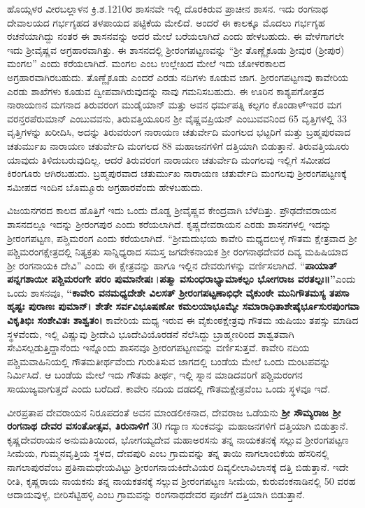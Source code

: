 ಹೊಯ್ಸಳರ ವೀರಬಲ್ಲಾಳನ ಕ್ರಿ.ಶ.1210ರ ಶಾಸನವೇ ಇಲ್ಲಿ ದೊರಕಿರುವ ಪ್ರಾಚೀನ ಶಾಸನ. ಇದು ರಂಗನಾಥ ದೇವಾಲಯದ ಗರ್ಭಗೃಹದ ತಳಪಾಯದ ಪಟ್ಟಿಕೆಯ ಮೇಲಿದೆ. ಅಂದರೆ ಈ ಕಾಲಕ್ಕೂ ಮೊದಲು ಗರ್ಭಗೃಹ ರಚನೆಯಾಗಿದ್ದು ನಂತರ ಈ ಶಾಸನವನ್ನು ಅದರ ಮೇಲೆ ಬರೆಯಲಾಗಿದೆ ಎಂದು ಹೇಳಬಹುದು. ಈ ವೇಳೆಗಾಗಲೇ ಇದು ಶ‍್ರೀವೈಷ್ಣವ ಅಗ್ರಹಾರವಾಗಿತ್ತು. ಈ ಶಾಸನದಲ್ಲಿ ಶ‍್ರೀರಂಗಪಟ್ಟಣವನ್ನು “ಶ‍್ರೀ ತೊಣ್ಣೈಕೂಡು ಶ‍್ರೀವುರ (ಶ‍್ರೀಪುರ) ಮಂಗಲ” ಎಂದು ಕರೆಯಲಾಗಿದೆ. ಮಂಗಲ ಎಂಬ ಉಲ್ಲೇಖದ ಮೇಲೆ ಇದು ಚೋಳರಕಾಲದ ಅಗ್ರಹಾರವಾಗಿರಬಹುದು. ತೊಣ್ಣೈಕೂಡು ಎಂದರೆ ಎರಡು ನದಿಗಳು ಕೂಡುವ ಜಾಗ. ಶ‍್ರೀರಂಗಪಟ್ಟಣವು ಕಾವೇರಿಯ ಎರಡು ಶಾಖೆಗಳು ಕೂಡುವ ದ್ವೀಪವಾಗಿರುವುದನ್ನು ನಾವು ಗಮನಿಸಬಹುದು. ಈ ಊರಿನ ಕಾಶ್ಯಪಗೋತ್ರದ ನಾರಾಯಣನ ಮಗನಾದ ತಿರುವರಂಗ ಮುಡೈಯಾನ್​ ಮತ್ತು ಅವನ ಧರ್ಮಪತ್ನಿ ಕಲ್ಪಗಂ ಕೊಂಡಾಳ್​ ಇವರ ಮಗ ವರನ್ತರಪೆರುಮಾನ್​ ಎಂಬುವವನು, ತಿರುವತ್ತಿಯೂರಿನ ಶ‍್ರೀ ವೈಷ್ಣವಪ್ರಿಯನ್​ ಎಂಬುವವನಿಂದ 65 ವೃತ್ತಿಗಳಲ್ಲಿ 33 ವೃತ್ತಿಗಳನ್ನು ಖರೀದಿಸಿ, ಅದನ್ನು ತಿರುವರುಂಗ ನಾರಾಯಣ ಚತುರ್ವೇದಿ ಮಂಗಲದ ಭಟ್ಟರಿಗೆ ಮತ್ತು ಬ್ರಹ್ಮಪುರವಾದ ಚತುರ್ಮುಖ ನಾರಾಯಣ ಚತುರ್ವೇದಿ ಮಂಗಲದ 88 ಮಹಾಜನಗಳಿಗೆ ದತ್ತಿಯಾಗಿ ಬಿಡುತ್ತಾನೆ. ತಿರುವತ್ತಿಯೂರು ಯಾವುದು ತಿಳಿದುಬರುವುದಿಲ್ಲ. ಆದರೆ ತಿರುವರಂಗ ನಾರಾಯಣ ಚತುರ್ವೇದಿ ಮಂಗಲವು ಇಲ್ಲಿಗೆ ಸಮೀಪದ ಕಿರಂಗೂರು ಆಗಿರಬಹುದು. ಬ್ರಹ್ಮಪುರವಾದ ಚತುರ್ಮುಖ ನಾರಾಯಣ ಚತುರ್ವೇದಿ ಮಂಗಲವು ಶ‍್ರೀರಂಗಪಟ್ಟಣಕ್ಕೆ ಸಮೀಪದ ಇಂದಿನ ಬೊಮ್ಮೂರು ಅಗ್ರಹಾರವೆಂದು ಹೇಳಬಹುದು.

ವಿಜಯನಗರದ ಕಾಲದ ಹೊತ್ತಿಗೆ ಇದು ಒಂದು ದೊಡ್ಡ ಶ‍್ರೀವೈಷ್ಣವ ಕೇಂದ್ರವಾಗಿ ಬೆಳೆದಿತ್ತು. ಪ್ರೌಢದೇವರಾಯನ ಶಾಸನದಲ್ಲೂ ಇದನ್ನು ಶ‍್ರೀರಂಗಪುರ ಎಂದು ಕರೆಯಲಾಗಿದೆ. ಕೃಷ್ಣದೇವರಾಯನ ಎರಡು ಶಾಸನಗಳಲ್ಲಿ ಇದನ್ನು ಶ‍್ರೀರಂಗಪಟ್ಟಣ, ಪಶ್ಚಿಮರಂಗ ಎಂದು ಕರೆಯಲಾಗಿದೆ. “ಶ‍್ರೀಮದುಭಯ ಕಾವೇರಿ ಮಧ್ಯದಲುಳ್ಳ ಗೌತಮ ಕ್ಷೇತ್ರವಾದ ಶ‍್ರೀ ಪಶ್ಚಿಮರಂಗಕ್ಷೇತ್ರದಲ್ಲಿ ನಿತ್ಯಕ್ರತು ಸಾನ್ನಿಧ್ಯರಾದ ಸಮಸ್ತ ಜಗದೇಕನಾಯಕ ಶ‍್ರೀ ರಂಗನಾಥದೇವರ ದಿವ್ಯ ಮಹಿಷಿಯಾದ ಶ‍್ರೀ ರಂಗನಾಯಕಿ ದೇವಿ” ಎಂದು ಈ ಕ್ಷೇತ್ರವನ್ನು ಹಾಗೂ ಇಲ್ಲಿನ ದೇವರುಗಳನ್ನು ವರ್ಣಿಸಲಾಗಿದೆ. “\textbf{ಪಾಯಾತ್​ ಪನ್ನಗಶಾಯೀ ಪಶ್ಚಿಮರಂಗೇ ಪರಂ ಪುಮಾನೇಷಃ}।\textbf{ಪತ್ಮಾ ವಸುಂಧರಾಭ್ಯಾಮಾಕಲ್ಪಂ ಭೋಗರಾಜ ವರತಲ್ಪಃ॥”}ಎಂದು ಒಂದು ಶಾಸನವೂ, \textbf{“ಕಾವೇರಿ ವನಮಧ್ಯದೇಶೇ ವಿಲಸತ್​ ಶ‍್ರೀರಂಗಪಟ್ಟಣಾಭಿಧೇ ವೈಕುಂಠೇ ಮುನಿಗೌತಮಸ್ಯ ತಪಸಾ ಹೃಷ್ಟಃ ಪುರಾಣಃ ಪುಮಾನ್​। ಶೇತೇ ಸರ್ವವಿಭೂಷಣೋ ಕಮಲಯಾಭೂಮ್ಯೇ ಸಮಾರಾಧಿತಾಶೇಷೈರ್ಭೂಸುರಪುಂಗವಾ ವಿಕೃತಿಭಿಃ ಸಂಶೇವಿತಃ ಶಾಶ್ವತಂ।} ಕಾವೇರಿಯ ಮಧ್ಯ ಇರುವ ಈ ವೈಕುಂಠಕ್ಷೇತ್ರವು ಗೌತಮ ಋಷಿಯು ತಪಸ್ಸು ಮಾಡಿದ ಸ್ಥಳವೆಂದು, ಇಲ್ಲಿ ವಿಷ್ಣುವು ಶ‍್ರೀದೇವಿ ಭೂದೇವಿಯೊರಡನೆ ನೆಲೆಸಿದ್ದು ಬ್ರಾಹ್ಮಣರಿಂದ ಶಾಶ್ವತವಾಗಿ ಸೇವಿಸಲ್ಪಡುತ್ತಿದ್ದಾನೆಂದು ಇನ್ನೊಂದು ಶಾಸನವೂ ಶ‍್ರೀರಂಗಪಟ್ಟಣವನ್ನು ವರ್ಣಿಸುತ್ತವೆ. ಕಾವೇರಿ ನದಿಯ ಪಶ್ಚಿಮವಾಹಿನಿಯಲ್ಲಿ ಗೌತಮತೀರ್ಥವೆಂದು ಗುರುತಿಸುವ ಜಾಗದಲ್ಲಿ ಬಂಡೆಯ ಮೇಲೆ ಒಂದು ಮಂಟಪವನ್ನು ನಿರ್ಮಿಸಿದೆ. ಆ ಬಂಡೆಯ ಮೇಲೆ ಇದು ಗೌತಮ ತೀರ್ಥ, ಇಲ್ಲಿ ಸ್ನಾನ ಮಾಡಿದವರಿಗೆ ಪಶ್ಚಿಮರಂಗನ ಸಾಯುಜ್ಯವಾಗುತ್ತದೆ ಎಂದು ಬರೆದಿದೆ. ಕಾವೇರಿ ನದಿಯ ದಡದಲ್ಲಿ ಗೌತಮಕ್ಷೇತ್ರವೆಂಬ ಒಂದು ಸ್ಥಳವೂ ಇದೆ.

ವೀರಪ್ರತಾಪ ದೇವರಾಯನ ನಿರೂಪದಂತೆ ಅವನ ಮಾಂಡಲೀಕನಾದ, ದೇವರಾಜ ಒಡೆಯನು \textbf{ಶ‍್ರೀ ಸೌಮ್ಯರಾಜ ಶ‍್ರೀ ರಂಗನಾಥ ದೇವರ ವಸಂತೋತ್ಸವ, ತಿರುನಾಳಿಗೆ} 30 ಗದ್ಯಾಣ ಸುಂಕವನ್ನು ಮಹಾಜನಗಳಿಗೆ ದತ್ತಿಯಾಗಿ ಬಿಡುತ್ತಾನೆ. ಕೃಷ್ಣದೇವರಾಯನ ಅನುಮತಿಯಿಂದ, ಭೋಗಯ್ಯದೇವ ಮಹಾಅರಸನು ತನ್ನ ನಾಯಕತನಕ್ಕೆ ಸಲ್ಲುವ ಶ‍್ರೀರಂಗಪಟ್ಟಣ ಸೀಮೆಯ, ಗುಮ್ಮನವೃತ್ತಿಯ ಸ್ಥಳದ, ದೇವಪುರಿ ಎಂಬ ಗ್ರಾಮವನ್ನು ತನ್ನ ತಾಯಿ ನಾಗಲಾಂಬಿಕೆಯ ಹೆಸರಿನಲ್ಲಿ ನಾಗಲಾಪುರವೆಂಬ ಪ್ರತಿನಾಮಧೇಯವಿಟ್ಟು ಶ‍್ರೀರಂಗನಾಯಕಿದೇವಿಯರ ದಿವ್ಯಲೀಲಾವಿಲಾಸಕ್ಕೆ ದತ್ತಿ ಬಿಡುತ್ತಾನೆ. ಇದೇ ರೀತಿ, ಕೃಷ್ಣರಾಯ ನಾಯಕನು ತನ್ನ ನಾಯಕತನಕ್ಕೆ ಸಲ್ಲುವ ಶ‍್ರೀರಂಗಪಟ್ಟಣ ಸೀಮೆಯ, ಕುರುವಂಕನಾಡಿನಲ್ಲಿ 50 ವರಹ ಆದಾಯವುಳ್ಳ, ಬೀರಿಸೆಟ್ಟಿಹಳ್ಳಿ ಎಂಬ ಗ್ರಾಮವನ್ನು ರಂಗನಾಥದೇವರ ಪೂಜೆಗೆ ದತ್ತಿಯಾಗಿ ಬಿಡುತ್ತಾನೆ.

